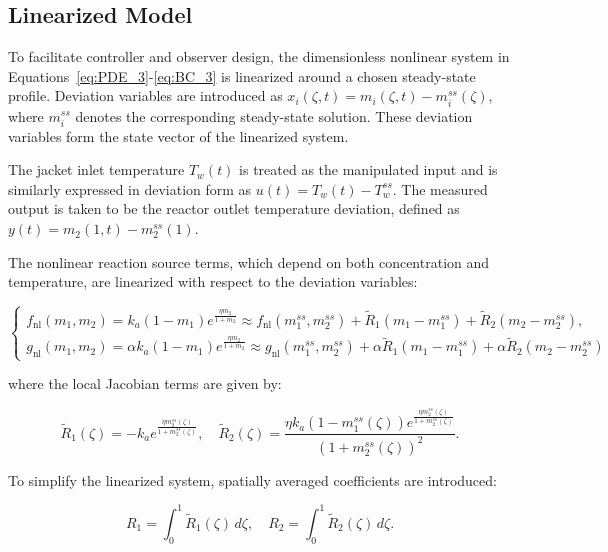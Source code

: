 \subsection{Linearized Model}

To facilitate controller and observer design, the dimensionless nonlinear system in Equations~\eqref{eq:PDE_3}-\eqref{eq:BC_3} is linearized around a chosen steady-state profile. Deviation variables are introduced as $ x_i(\zeta, t) = m_i(\zeta, t) - m_i^{ss}(\zeta) $, where $ m_i^{ss} $ denotes the corresponding steady-state solution. These deviation variables form the state vector of the linearized system. 

The jacket inlet temperature $ T_w(t) $ is treated as the manipulated input and is similarly expressed in deviation form as $ u(t) = T_w(t) - T_w^{ss} $. The measured output is taken to be the reactor outlet temperature deviation, defined as $ y(t) = m_2(1, t) - m_2^{ss}(1) $.

The nonlinear reaction source terms, which depend on both concentration and temperature, are linearized with respect to the deviation variables:

\begin{equation}
\begin{cases}
    f_{\text{nl}}(m_1, m_2) = k_a (1 - m_1) e^{\frac{\eta m_2}{1 + m_2}} \approx f_{\text{nl}}(m_{1}^{ss}, m_{2}^{ss}) + \tilde{R}_1 (m_1 - m_{1}^{ss}) + \tilde{R}_2 (m_2 - m_{2}^{ss}), \\[1.5ex]
    g_{\text{nl}}(m_1, m_2) = \alpha k_a (1 - m_1) e^{\frac{\eta m_2}{1 + m_2}} \approx g_{\text{nl}}(m_{1}^{ss}, m_{2}^{ss}) + \alpha \tilde{R}_1 (m_1 - m_{1}^{ss}) + \alpha \tilde{R}_2 (m_2 - m_{2}^{ss})
\end{cases}
\end{equation}


where the local Jacobian terms are given by:

\begin{equation}
    \tilde{R}_1(\zeta) = -k_a e^{\frac{\eta m_{2}^{ss}(\zeta)}{1 + m_{2}^{ss}(\zeta)}}, \quad
    \tilde{R}_2(\zeta) = \frac{\eta k_a (1 - m_{1}^{ss}(\zeta)) e^{\frac{\eta m_{2}^{ss}(\zeta)}{1 + m_{2}^{ss}(\zeta)}}}{(1 + m_{2}^{ss}(\zeta))^2}.
\end{equation}

To simplify the linearized system, spatially averaged coefficients are introduced:

\begin{equation}
    R_1 = \int_0^1 \tilde{R}_1(\zeta) \, d\zeta, \quad
    R_2 = \int_0^1 \tilde{R}_2(\zeta) \, d\zeta.
\end{equation}

